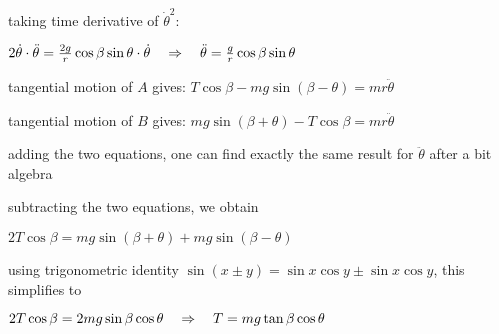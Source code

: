 taking time derivative of $\dot{\theta}^2$:

{

\centering

$2\dot{\theta}\cdot\ddot{\theta} = \frac{2g}{r}\cos\beta\sin\theta\cdot\dot{\theta} \quad \Rightarrow \quad \ddot{\theta} = \frac{g}{r}\cos\beta\sin\theta$

}

tangential motion of $A$ gives: $T\cos\beta - mg\sin(\beta-\theta) = m r\ddot{\theta}$

tangential motion of $B$ gives: $mg\sin(\beta+\theta) - T\cos\beta = m r\ddot{\theta}$

adding the two equations, one can find exactly the same result for $\ddot{\theta}$ after a bit algebra

subtracting the two equations, we obtain

{

\centering 

$2T\cos\beta = mg \sin(\beta+\theta) + mg\sin(\beta-\theta)$

}

using trigonometric identity $\sin(x\pm y) = \sin x \cos y \pm \sin x \cos y$, this simplifies to

{
	
	\centering 
	
	$2T \cos\beta = 2 mg \sin\beta \cos\theta \quad \Rightarrow \quad T = mg \tan\beta \cos\theta$
	
}